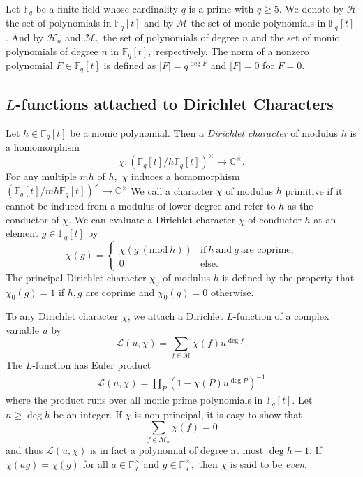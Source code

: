 \documentclass[12pt,reqno]{amsart}
\newcommand{\Mod}[1]{\ (\mathrm{mod}\ #1)}
\newcommand{\BF}{\mathbb{F}}
\newcommand{\CL}{\mathcal{L}}
\newcommand{\CM}{\mathcal{M}}
\newcommand{\CH}{\mathcal{H}}
\begin{document}
Let $\BF_{q}$ be a finite field whose cardinality $q$ is a prime with $q \geq 5.$ We denote by $\CH$ the set of polynomials in $\BF_{q}[t]$ and by $\CM$ the set of monic polynomials in $\BF_{q}[t]$. And by $\CH_{n}$ and $\CM_{n}$ the set of polynomials of degree $n$ and the set of monic polynomials of degree $n$ in $\BF_{q}[t],$ respectively. The norm of a nonzero polynomial $F \in \BF_{q}[t]$ is defined as $|F| = q^{\deg F}$ and $|F|=0$ for $F=0$.


\subsection{$L$-functions attached to Dirichlet Characters} Let $h \in \BF_{q}[t]$ be a monic polynomial. Then a \textit{Dirichlet character} of modulus $h$ is a homomorphism 
$$
\chi : ( \BF_{q}[t]/ h \BF_{q}[t])^{\times} \rightarrow \mathbb{C}^{\times}.
$$
For any multiple $m h$ of $h,$ $\chi$ induces a homomorphism $(\BF_{q}[t]/ m h \BF_{q}[t])^{\times} \rightarrow \mathbb{C}^{\times}$
We call a character $\chi$ of modulus $h$ primitive if it cannot be induced from a modulus of lower degree and refer to $h$ as the conductor of $\chi$. We can evaluate a Dirichlet character $\chi$ of
conductor $h$ at an element $g \in \BF_{q}[t]$ by
\[
\chi(g) = \begin{cases} 
\chi ( g \Mod{h}) & \text{if}\ h\ \text{and}\ g\ \text{are coprime,}\\
0 & \text{else.}
\end{cases}
\]
The principal Dirichlet character $\chi_{0}$ of modulus $h$ is defined by the property that $\chi_{0}(g) = 1 $ if $h, g$ are coprime and $\chi_{0}(g)= 0$ otherwise. 

To any Dirichlet character $\chi$, we attach a Dirichlet $L$-function of a complex variable $u$ by
\[
\CL(u,\chi) = \sum_{f \in \CM} \chi(f) u^{\deg f}. 
\]
The $L$-function has Euler product
\begin{align*}
    \CL(u,\chi) = \prod_{P} (1-\chi(P)u^{\deg P})^{-1}
\end{align*}
where the product runs over all monic prime polynomials in $\BF_{q}[t]$. Let $n \geq \deg h$ be an integer. If $\chi$ is non-principal, it is easy to show that %
\[
\sum_{f \in \CM_{n}} \chi(f) = 0 
\]
and thus $\CL(u, \chi)$ is in fact a polynomial of degree at most $\deg h -1.$ If $\chi(ag) = \chi(g)$ for all $a \in \BF_{q}^{\times}$ and $g \in \BF_{q}^{\times},$ then $\chi$ is said to be \textit{even}.
\end{document}
